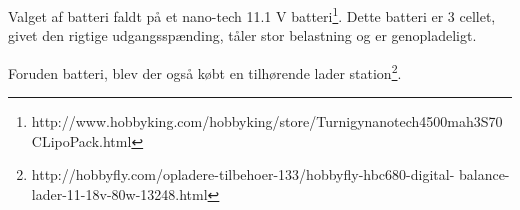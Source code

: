 Valget af batteri faldt på et nano-tech 11.1 V batteri\footnote{http://www.hobbyking.com/hobbyking/store/\textunderscore{}\textunderscore\textunderscore Turnigy\textunderscore \newline nano\textunderscore tech\textunderscore 4500mah\textunderscore 3S\textunderscore 70C\textunderscore Lipo\textunderscore Pack.html}. Dette batteri er 3 cellet, givet den rigtige udgangsspænding, tåler stor belastning og er genopladeligt. 

Foruden batteri, blev der også købt en tilhørende lader station\footnote{http://hobbyfly.com/opladere-tilbehoer-133/hobbyfly-hbc680-digital- \newline balance-lader-11-18v-80w-13248.html}.





